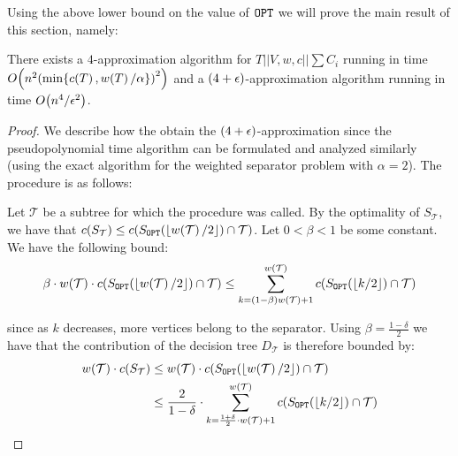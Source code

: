     Using the above lower bound on the value of $\texttt{OPT}$ we will prove the main result of this section, namely:
    \begin{theorem}
        There exists a $4$-approximation algorithm for $T||V, w, c||\sum C_i$ running in time $O\mathopen{}\left( n^2\mathopen{}\left( \min\mathopen{}\left\{ c\mathopen{}\left( T \right), w\mathopen{}\left( T \right)/\alpha \right\} \right)^2 \right)$ and a $\mathopen{}\left( 4+\epsilon \right)$-approximation algorithm running in time $O\mathopen{}\left( n^4/\epsilon^2 \right)$.
        \begin{proof}
            We describe how the obtain the $\mathopen{}\left( 4+\epsilon \right)$-approximation since the pseudopolynomial time algorithm can be formulated and analyzed similarly (using the exact algorithm for the weighted separator problem with $\alpha=2$).
            The procedure is as follows: 
            
            
        
            Let $\mathcal{T}$ be a subtree for which the procedure was called. By the optimality of $S_{\mathcal{T}}$, we have that $c\mathopen{}\left( S_{\mathcal{T}} \right)\leq c\mathopen{}\left( S_{\texttt{OPT}}\mathopen{}\left( \mathopen{}\left\lfloor w\mathopen{}\left( \mathcal{T} \right)/2 \right\rfloor \right)\cap\mathcal{T} \right)$. Let $0<\beta<1$ be some constant. We have the following bound:
            $$
           \beta\cdot w\mathopen{}\left( \mathcal{T} \right)\cdot c\mathopen{}\left( S_{\texttt{OPT}}\mathopen{}\left( \mathopen{}\left\lfloor w\mathopen{}\left( \mathcal{T} \right)/2 \right\rfloor \right)\cap \mathcal{T} \right)
            \leq \sum_{k=\mathopen{}\left( 1-\beta \right)w\mathopen{}\left( \mathcal{T} \right)+1}^{w\mathopen{}\left( \mathcal{T} \right)}c\mathopen{}\left( S_{\texttt{OPT}}\mathopen{}\left( \mathopen{}\left\lfloor k/2 \right\rfloor \right)\cap \mathcal{T} \right)
            $$
            
             since as $k$ decreases, more vertices belong to the separator. 
            Using $\beta=\frac{1-\delta}{2}$ we have that the contribution of the decision tree $D_{\mathcal{T}}$ is therefore bounded by:
            \begin{align*}
                w\mathopen{}\left( \mathcal{T} \right)\cdot c\mathopen{}\left( S_{\mathcal{T}} \right)
                &\leq w\mathopen{}\left( \mathcal{T} \right)\cdot c\mathopen{}\left( S_{\texttt{OPT}}\mathopen{}\left( \mathopen{}\left\lfloor w\mathopen{}\left( \mathcal{T} \right)/2 \right\rfloor \right)\cap \mathcal{T} \right)\\
                &\leq \frac{2}{1-\delta}\cdot \sum_{k=\frac{1+\delta}{2}\cdot w\mathopen{}\left( \mathcal{T} \right)+1}^{w\mathopen{}\left( \mathcal{T} \right)}c\mathopen{}\left( S_{\texttt{OPT}}\mathopen{}\left( \mathopen{}\left\lfloor k/2 \right\rfloor \right)\cap \mathcal{T} \right)
            \end{align*}
            

\end{proof}
\end{theorem}
